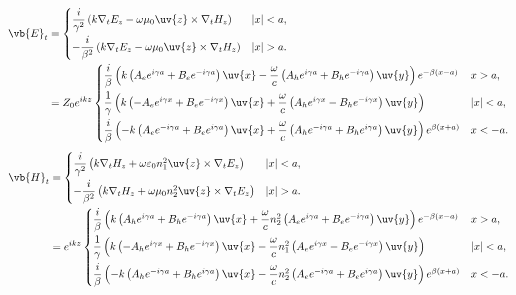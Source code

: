\begin{align*}
	\vb{E}_t &=
	\begin{cases}
		\dfrac{i}{\gamma^2} \left( k \nabla_t E_z - \omega\mu_0 \uv{z} \times \nabla_t H_z \right) & |x| < a, \\[8pt]
		-\dfrac{i}{\beta^2} \left( k \nabla_t E_z - \omega\mu_0 \uv{z} \times \nabla_t H_z \right) & |x| > a.
	\end{cases}\\
	&= Z_0 e^{ikz}
	\begin{cases}
		\dfrac{i}{\beta} \left( k \left( A_e e^{i\gamma a} + B_e e^{-i\gamma a} \right) \uv{x} - \dfrac{\omega}{c} \left( A_h e^{i\gamma a} + B_h e^{-i\gamma a} \right) \uv{y} \right) e^{-\beta(x - a)} & x > a,   \\[8pt]
		\dfrac{1}{\gamma} \left( k \left( -A_e e^{i\gamma x} + B_e e^{-i\gamma x} \right) \uv{x} + \dfrac{\omega}{c} \left( A_h e^{i\gamma x} - B_h e^{-i\gamma x} \right) \uv{y} \right)                 & |x| < a, \\[8pt]
		\dfrac{i}{\beta} \left( -k \left( A_e e^{-i\gamma a} + B_e e^{i\gamma a} \right) \uv{x} + \dfrac{\omega}{c} \left( A_h e^{-i\gamma a} + B_h e^{i\gamma a} \right)\uv{y} \right) e^{\beta(x + a)}  & x < -a.
	\end{cases}
\end{align*}\begin{align*}
	\vb{H}_t &=
	\begin{cases}
		\dfrac{i}{\gamma^2} \left( k \nabla_t H_z + \omega\varepsilon_0 n_1^2 \uv{z} \times \nabla_t E_z \right) & |x| < a, \\[8pt]
		-\dfrac{i}{\beta^2} \left( k \nabla_t H_z + \omega\mu_0 n_2^2 \uv{z} \times \nabla_t E_z \right)         & |x| > a.
	\end{cases}\\
	&= e^{ikz}
	\begin{cases}
		\dfrac{i}{\beta} \left( k \left( A_h e^{i\gamma a} + B_h e^{-i\gamma a} \right) \uv{x} + \dfrac{\omega}{c} n_2^2 \left( A_e e^{i\gamma a} + B_e e^{-i\gamma a} \right) \uv{y} \right) e^{-\beta(x - a)} & x > a,   \\[8pt]
		\dfrac{1}{\gamma} \left( k \left( -A_h e^{i\gamma x} + B_h e^{-i\gamma x} \right) \uv{x} - \dfrac{\omega}{c} n_1^2 \left( A_e e^{i\gamma x} - B_e e^{-i\gamma x} \right) \uv{y} \right)                  & |x| < a, \\[8pt]
		\dfrac{i}{\beta} \left( -k \left( A_h e^{-i\gamma a} + B_h e^{i\gamma a} \right) \uv{x} - \dfrac{\omega}{c} n_2^2 \left( A_e e^{-i\gamma a} + B_e e^{i\gamma a} \right)\uv{y} \right) e^{\beta(x + a)}    & x < -a.
	\end{cases}
\end{align*}
